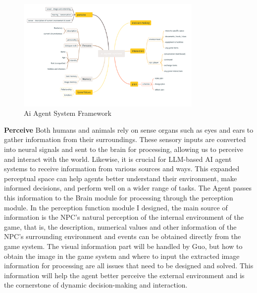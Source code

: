 \begin{figure}
    \centering
    \includegraphics[width=0.8\textwidth]{image/system_mindimg.pdf}
    \caption{Ai Agent System Framework}
  \label{fig:system_mindimg}
\end{figure}

\textbf{Perceive}\quad
Both humans and animals rely on sense organs such as eyes and ears to gather information from their surroundings. 
These sensory inputs are converted into neural signals and sent to the brain for processing, allowing us to perceive and interact with the world. 
Likewise, it is crucial for LLM-based AI agent systems to receive information from various sources and ways. 
This expanded perceptual space can help agents better understand their environment, make informed decisions, and perform well on a wider range of tasks\cite{xi_rise_2023}. 
The Agent passes this information to the Brain module for processing through the perception module.
In the perception function module I designed, the main source of information is the NPC's natural perception of the internal environment of the game, that is, the description, numerical values and other information of the NPC's surrounding environment and events can be obtained directly from the game system. 
The visual information part will be handled by Guo, but how to obtain the image in the game system and where to input the extracted image information for processing are all issues that need to be designed and solved. 
This information will help the agent better perceive the external environment and is the cornerstone of dynamic decision-making and interaction.

